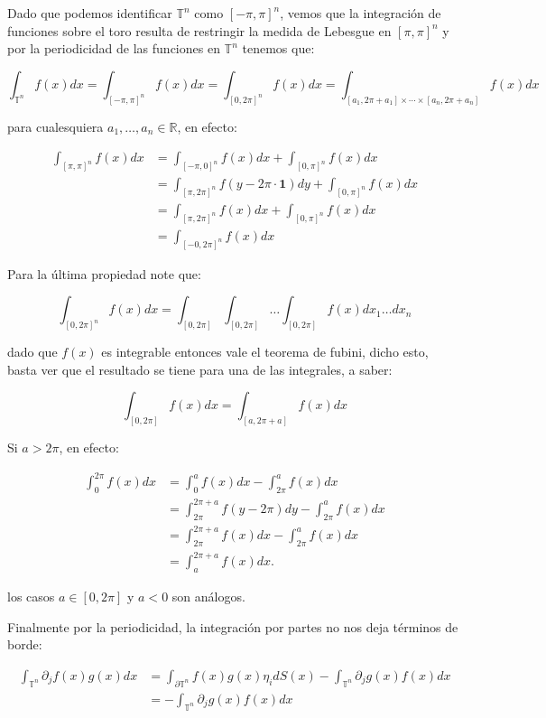 \documentclass[12pt]{article}
\newcommand\R{\ensuremath{\mathbb{R}}}
\begin{document}
\begin{note}
    Dado que  podemos identificar $\mathbb{T}^n$ como $[-\pi,\pi]^n$, vemos que la integración de funciones sobre el toro resulta de restringir la medida de Lebesgue en $[\pi,\pi]^n$ y por la periodicidad de las funciones en $\mathbb{T}^n$ tenemos que:

    $$\int_{\mathbb{T}^n} f(x) d x=\int_{[-\pi,\pi]^n} f(x) d x=\int_{[0,2\pi]^n} f(x) d x=\int_{\left[a_1, 2\pi+a_1\right] \times \cdots \times\left[a_n, 2\pi+a_n\right]} f(x) d x$$


    para cualesquiera $a_1,\ldots,a_n \in \R$, en efecto:

    $$\begin{aligned}
    \int_{[\pi, \pi]^n} f(x) d x & =\int_{[-\pi, 0]^n} f(x) d x+\int_{[0, \pi]^n} f(x) d x \\
    & =\int_{[\pi, 2 \pi]^n} f(y-2 \pi \cdot \mathbf{1}) d y+\int_{[0, \pi]^n} f(x) d x \\
    & =\int_{[\pi, 2 \pi]^n} f(x) d x+\int_{[0, \pi]^n} f(x) d x\\
    &=\int_{[-0,2\pi]^n} f(x) d x
    \end{aligned}$$

Para la última propiedad note que:

$$\int_{[0,2\pi]^ n}f(x)dx=\int_{[0,2\pi]}\int_{[0,2\pi]}\ldots\int_{[0,2\pi]}f(x) dx_1\ldots dx_n$$

dado que $f(x)$ es integrable entonces vale el teorema de fubini, dicho esto, basta ver que el resultado se tiene para una de las integrales, a saber:

$$\int_{[0,2\pi]}f(x)dx=\int_{[a,2\pi+a]}f(x)dx$$

Si $a>2\pi$, en efecto:

\begin{align*}
    \int_0^{2\pi}f(x)dx&=\int_0^af(x)dx-\int_{2\pi}^af(x) dx\\
    &=\int_{2\pi}^{2\pi+a}f(y-2\pi)dy-\int_{2\pi}^af(x)dx\\
    &=\int_{2\pi}^{2\pi+a}f(x)dx-\int_{2\pi}^af(x)dx\\
    &=\int_a^{2\pi+a}f(x)dx
.\end{align*}

los casos $a\in [0,2\pi]$ y $a<0$ son análogos.
\end{note}

Finalmente por la periodicidad, la integración por partes no nos deja términos de borde:

    \begin{align*}
        \int_{\mathbb{T}^n} \partial_j f(x) g(x) d x&=\int_{\partial \mathbb{T}^n}f(x)g(x)\eta_i dS(x)-\int_{\mathbb{T}^n} \partial_j g(x) f(x) d x\\
        &=-\int_{\mathbb{T}^n} \partial_j g(x) f(x) d x
    \end{align*}
\end{document}
